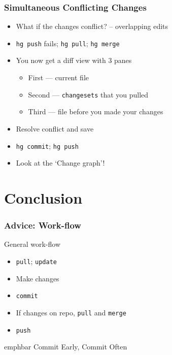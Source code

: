 \documentclass[14pt,compress]{beamer}
\newcommand{\emphbar}[1]
{\begin{beamercolorbox}[rounded=true]{emphbar} 
      {#1}
 \end{beamercolorbox}
}
\newcommand{\typ}[1]{\lstinline{#1}}
\begin{document}
\begin{frame}
  \frametitle{Simultaneous Conflicting Changes}
  \begin{itemize}
  \item What if the changes conflict? -- overlapping edits
  \item \typ{hg push} fails; \typ{hg pull}; \typ{hg merge}
  \item You now get a diff view with 3 panes 
    \begin{itemize}
    \item First --- current file
    \item Second --- \typ{changesets} that you pulled
    \item Third --- file before you made your changes
    \end{itemize}
  \item Resolve conflict and save
  \item \typ{hg commit}; \typ{hg push}
  \item Look at the `Change graph'!
  \end{itemize}
\end{frame}

\section{Conclusion}

\begin{frame}
  \frametitle{\alert{Advice}: Work-flow}
  General work-flow
  \begin{itemize}
  \item \typ{pull}; \typ{update}
  \item Make changes
  \item \typ{commit}
  \item If changes on repo, \typ{pull} and \typ{merge}
  \item \typ{push}
  \end{itemize}
  \emphbar{Commit Early, Commit Often}
\end{frame}
\end{document}
